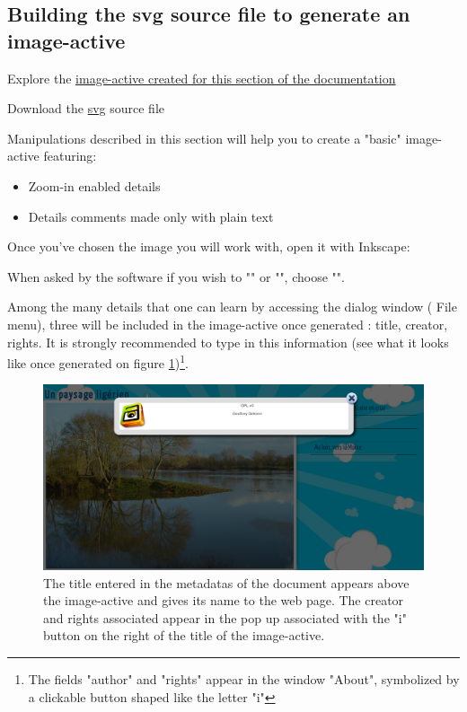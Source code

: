\subsection{Building the svg source file to generate an image-active}\label{preparation_svg}

\begin{links}
Explore the \href{http://images-actives.crdp-versailles.fr/beta/demo/tuto/xia1}{image-active 
created for this section of the documentation}

Download the \href{http://images-actives.crdp-versailles.fr/beta/demo/tuto/xia1/svg/xia1.svg}{svg} source file
\end{links}

Manipulations described in this section will help you to
create a "basic" image-active featuring:
\begin{itemize}
 \item Zoom-in enabled details
 \item Details comments made only with plain text
\end{itemize}


Once you've chosen the image you will work with, open it with Inkscape:


When asked by the software if you wish to "" or "", choose "".

Among the many details that one can learn by accessing the 
dialog window  (\chemin
{File} menu), three will be included in the image-active once
generated : title, creator, rights. It is strongly recommended to type in this information
(see what it looks like once generated on figure \ref{titre_ia})\footnote{The
fields "author" and "rights" appear in the window
"About", symbolized by a clickable button shaped like the letter "i"}.

\begin{figure}[htp]
 \centering
 \includegraphics[width=\textwidth,clip=true,trim=0mm 120mm 55mm 0mm ]{images/titre_ia}
 \caption{The title entered in the metadatas of the document appears above 
the image-active and gives its name to the web page. The creator and 
 rights associated appear in the pop up associated with the "i" button 
on the right of the title of the image-active.}
 \label{titre_ia}
\end{figure}

